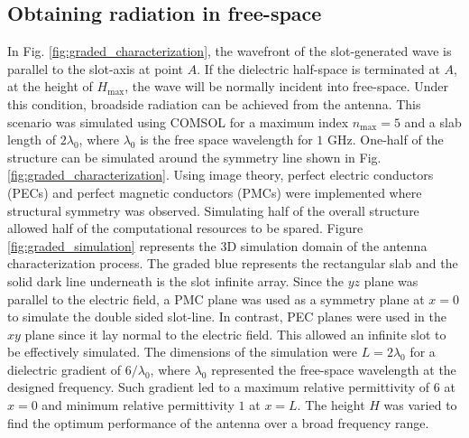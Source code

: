 \subsection{Obtaining radiation in free-space}
In Fig. \ref{fig:graded_characterization}, the wavefront of the slot-generated wave is parallel to the slot-axis at point $A$. If the dielectric half-space is terminated at $A$, at the height of $H_{\mathrm{max}}$, the wave will be normally incident into free-space. Under this condition, broadside radiation can be achieved from the antenna. This scenario was simulated using COMSOL for a maximum index $n_{\mathrm{max}} = 5$ and a slab length of $2 \lambda_0$, where $\lambda_0$ is the free space wavelength for $1$ GHz. One-half of the structure can be simulated around the symmetry line shown in Fig. \ref{fig:graded_characterization}. Using image theory, perfect electric conductors (PECs) and perfect magnetic conductors (PMCs) were implemented where structural symmetry was observed. Simulating half of the overall structure allowed half of the computational resources to be spared. Figure \ref{fig:graded_simulation} represents the 3D simulation domain of the antenna characterization process. The graded blue represents the rectangular slab and the solid dark line underneath is the slot infinite array. Since the $yz$ plane was parallel to the electric field, a PMC plane was used as a symmetry plane at $x=0$ to simulate the double sided slot-line. In contrast, PEC planes were used in the $xy$ plane since it lay normal to the electric field. This allowed an infinite slot to be effectively simulated. The dimensions of the simulation were $L=2\lambda_0$ for a dielectric gradient of $6/\lambda_0$, where $\lambda_0$ represented the free-space wavelength at the designed frequency. Such gradient led to a maximum relative permittivity of $6$ at $x=0$ and minimum relative permittivity $1$ at $x=L$. The height $H$ was varied to find the optimum performance of the antenna over a broad frequency range.

